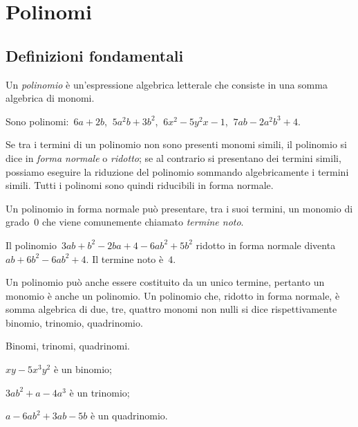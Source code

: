 
\chapter{Polinomi}
\section{Definizioni fondamentali}

\begin{definizione}
Un \emph{polinomio} è un'espressione algebrica letterale che consiste in una somma algebrica di monomi.
\end{definizione}

\begin{exrig}
\begin{esempio}
Sono polinomi:~$6a+2b$, $\:5a^2b+3b^2$, $\:6x^2-5y^2x-1$, $\:7ab-2a^2b^3+4$.
\end{esempio}
\end{exrig}

Se tra i termini di un polinomio non sono presenti monomi simili, il polinomio si dice in \emph{forma normale} o
\emph{ridotto}; se al contrario si presentano dei termini simili, possiamo eseguire la riduzione del polinomio
sommando algebricamente i termini simili. Tutti i polinomi sono quindi riducibili in forma normale.

Un polinomio in forma normale può presentare, tra i suoi termini, un monomio di grado~0 che viene
comunemente chiamato \emph{termine noto}.

\begin{exrig}
\begin{esempio}
Il polinomio~$3ab+b^2−2ba+4−6ab^2+5b^2$ ridotto in forma normale diventa~$ab+6b^2−6ab^2+4$. Il termine noto è~$4$.
\end{esempio}
\end{exrig}

\ovalbox{\risolvi\ref{ese:10.1}}\vspazio

Un polinomio può anche essere costituito da un unico termine, pertanto un monomio è anche un polinomio.
Un polinomio che, ridotto in forma normale, è somma algebrica di due, tre, quattro monomi non nulli si dice
rispettivamente binomio, trinomio, quadrinomio.

\begin{exrig}
\begin{esempio}
Binomi, trinomi, quadrinomi.
\begin{enumeratea}
\item $xy−5x^3y^2$ è un binomio;
\item $3ab^2 +a−4a^3$ è un trinomio;
\item $a−6ab^2+3ab−5b$ è un quadrinomio.
\end{enumeratea}
\end{esempio}
\end{exrig}

